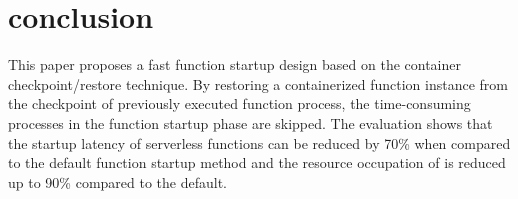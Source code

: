 \section{conclusion}

This paper proposes a fast function startup design based on the container checkpoint/restore technique. 
By restoring a containerized function instance from the checkpoint of previously executed function process, 
the time-consuming processes in the function startup phase are skipped. 
The evaluation shows that \pname the startup latency of serverless functions can be reduced by 70\% 
when compared to the default function startup method and the resource occupation of \pname is reduced 
up to 90\% compared to the default. 